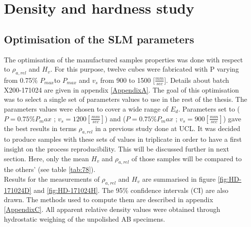 \section{Density and hardness study}
\subsection{Optimisation of the SLM parameters}
\label{Rparaopti}
The optimisation of the manufactured samples properties was done with respect to $\rho_{a,rel}$ and $H_v$. For this purpose, twelve cubes were fabricated with P varying from 0.75\% $P_{max} $to $P_{max}$ and $v_s$ from 900 to 1500 [$\frac{mm}{sec}$]. Details about batch X200-171024 are given in appendix \ref{AppendixA}. The goal of this optimisation was to select a single set of parameters values to use in the rest of the thesis. The parameters values were chosen to cover a wide range of $E_d$. Parameters set to ($P=0.75\% P_max$ ; $v_s=1200 [\frac{mm}{sec}]$) and ($P=0.75\% P_max$ ; $v_s=900 [\frac{mm}{sec}]$) gave the best results in terms $\rho_{a,rel}$ in a previous study done at UCL. It was decided to produce samples with these sets of values in triplicate in order to have a first insight on the process reproducibility. This will be discussed further in next section. Here, only the mean $H_v$ and $\rho_{a,rel}$ of those samples will be compared to the others' (see table \ref{tab:78}). \\

Results for the measurements of $\rho_{a,rel}$ and $H_v$ are summarised in figure \ref{fig:HD-171024D} and \ref{fig:HD-171024H}. The 95\% confidence intervals (CI) are also drawn. The methods used to compute them are described in appendix \ref{AppendixC}. All apparent relative density values were obtained through hydrostatic weighing of the unpolished AB specimens.\\

